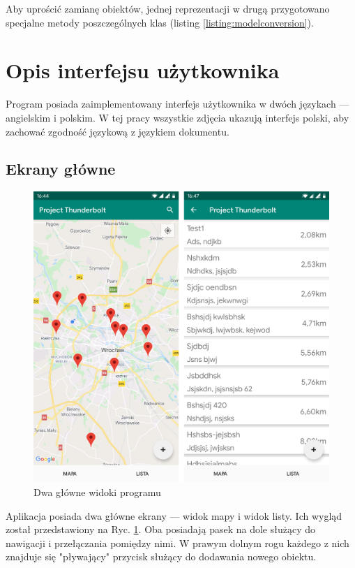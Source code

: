 \documentclass[polish,polish,a4paper,12pt]{article}
\let\sectioncmd\section
\renewcommand{\section}{\clearpage\sectioncmd}
\begin{document}
	Aby uprościć zamianę obiektów, jednej reprezentacji w drugą przygotowano specjalne metody poszczególnych klas (listing \ref{listing:modelconversion}).

\section{Opis interfejsu użytkownika}\label{ui}

Program posiada zaimplementowany interfejs użytkownika w dwóch językach — angielskim i polskim. W tej pracy wszystkie zdjęcia ukazują interfejs polski, aby zachować zgodność językową z językiem dokumentu.

	\subsection{Ekrany główne}

	\begin{figure}[H]
		\centering
		\includegraphics[width = \textwidth]{screenshot-main}
		\caption{Dwa główne widoki programu}
		\label{fig:screenshotmain}
	\end{figure}

	Aplikacja posiada dwa główne ekrany — widok mapy i widok listy. Ich wygląd został przedstawiony na Ryc. \ref{fig:screenshotmain}. Oba posiadają pasek na dole służący do nawigacji i przełączania pomiędzy nimi. W prawym dolnym rogu każdego z nich znajduje się "pływający" przycisk służący do dodawania nowego obiektu.
\end{document}
